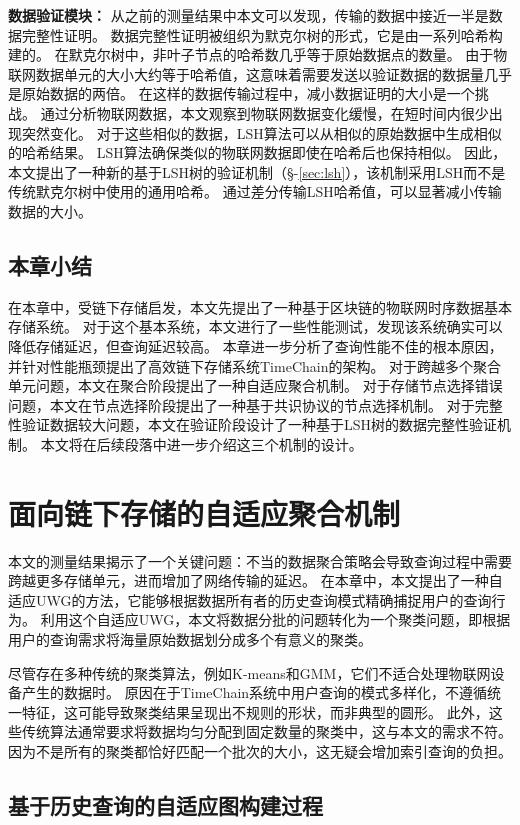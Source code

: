 \textbf{数据验证模块：}
从之前的测量结果中本文可以发现，传输的数据中接近一半是数据完整性证明。
数据完整性证明被组织为默克尔树的形式，它是由一系列哈希构建的。
在默克尔树中，非叶子节点的哈希数几乎等于原始数据点的数量。
由于物联网数据单元的大小大约等于哈希值，这意味着需要发送以验证数据的数据量几乎是原始数据的两倍。
在这样的数据传输过程中，减小数据证明的大小是一个挑战。
通过分析物联网数据，本文观察到物联网数据变化缓慢，在短时间内很少出现突然变化。
对于这些相似的数据，LSH算法可以从相似的原始数据中生成相似的哈希结果。
LSH算法确保类似的物联网数据即使在哈希后也保持相似。
因此，本文提出了一种新的基于LSH树的验证机制（§-\ref{sec:lsh}），该机制采用LSH而不是传统默克尔树中使用的通用哈希。
通过差分传输LSH哈希值，可以显著减小传输数据的大小。

\section{本章小结}
在本章中，受链下存储启发，本文先提出了一种基于区块链的物联网时序数据基本存储系统。
对于这个基本系统，本文进行了一些性能测试，发现该系统确实可以降低存储延迟，但查询延迟较高。
本章进一步分析了查询性能不佳的根本原因，并针对性能瓶颈提出了高效链下存储系统TimeChain的架构。
对于跨越多个聚合单元问题，本文在聚合阶段提出了一种自适应聚合机制。
对于存储节点选择错误问题，本文在节点选择阶段提出了一种基于共识协议的节点选择机制。
对于完整性验证数据较大问题，本文在验证阶段设计了一种基于LSH树的数据完整性验证机制。
本文将在后续段落中进一步介绍这三个机制的设计。

\chapter{面向链下存储的自适应聚合机制}
\label{sec:packaging}
本文的测量结果揭示了一个关键问题：不当的数据聚合策略会导致查询过程中需要跨越更多存储单元，进而增加了网络传输的延迟。
在本章中，本文提出了一种自适应UWG的方法，它能够根据数据所有者的历史查询模式精确捕捉用户的查询行为。
利用这个自适应UWG，本文将数据分批的问题转化为一个聚类问题，即根据用户的查询需求将海量原始数据划分成多个有意义的聚类。

尽管存在多种传统的聚类算法，例如K-means和GMM，它们不适合处理物联网设备产生的数据时。
原因在于TimeChain系统中用户查询的模式多样化，不遵循统一特征，这可能导致聚类结果呈现出不规则的形状，而非典型的圆形。
此外，这些传统算法通常要求将数据均匀分配到固定数量的聚类中，这与本文的需求不符。
因为不是所有的聚类都恰好匹配一个批次的大小，这无疑会增加索引查询的负担。

\section{基于历史查询的自适应图构建过程}
\label{sec:UWG}

